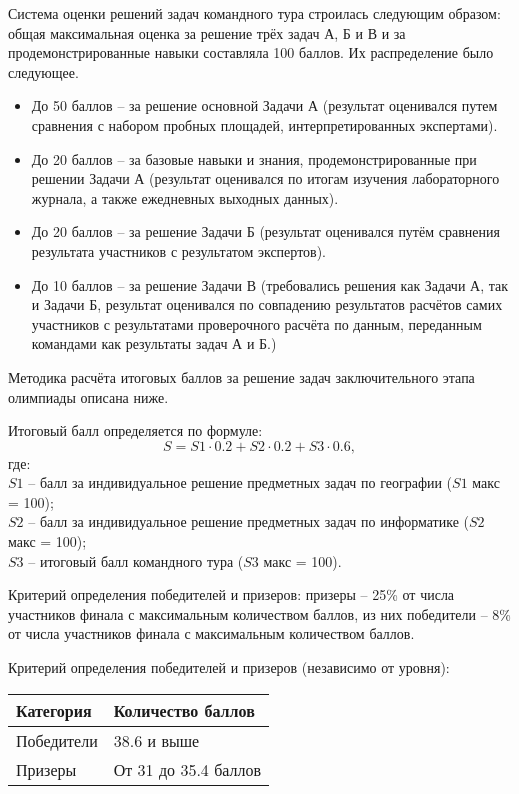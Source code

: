 Система оценки решений задач командного тура строилась следующим образом: общая максимальная оценка за решение  трёх задач  А, Б и В и за продемонстрированные навыки составляла 100 баллов. Их распределение было следующее.
\begin{itemize}
    \item До 50 баллов – за решение основной Задачи А (результат оценивался путем сравнения с набором пробных площадей, интерпретированных экспертами).
    \item До 20 баллов – за базовые навыки и знания, продемонстрированные при решении Задачи А (результат оценивался по итогам изучения лабораторного журнала, а также ежедневных выходных данных).
    \item До 20 баллов – за решение Задачи Б (результат оценивался путём сравнения результата участников с результатом экспертов).
    \item До 10 баллов – за решение Задачи В (требовались решения как Задачи А, так и Задачи Б, результат оценивался по совпадению результатов расчётов самих участников с результатами проверочного расчёта по данным, переданным командами как результаты задач А и Б.)
\end{itemize}

Методика расчёта итоговых баллов за решение задач заключительного этапа олимпиады описана ниже.

Итоговый балл определяется по формуле: $$S = S1 \cdot 0.2 + S2 \cdot 0.2 + S3 \cdot 0.6, $$где:\\
$S1$ – балл за индивидуальное решение предметных задач по географии ($S1$ макс = 100);\\
$S2$ – балл за индивидуальное решение предметных задач по информатике ($S2$ макс = 100);\\
$S3$ – итоговый балл командного тура ($S3$ макс = 100).

Критерий определения победителей и призеров: призеры – 25\% от числа участников финала с максимальным количеством баллов, из них победители – 8\% от числа участников финала с максимальным количеством баллов.

Критерий определения победителей и призеров (независимо от уровня):
\begin{center}
    \begin{tabular}{|l|l|}
        \hline
        Категория& Количество баллов\\
        \hline
        Победители&38.6 и выше\\
        \hline
        Призеры&От 31 до 35.4 баллов\\
        \hline
    \end{tabular}
\end{center}